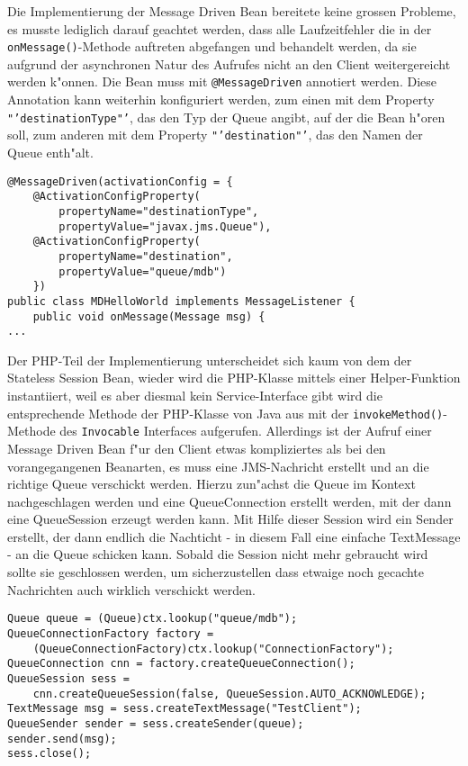 Die Implementierung der Message Driven Bean bereitete keine grossen Probleme, es musste lediglich
darauf geachtet werden, dass alle Laufzeitfehler die in der \texttt{onMessage()}-Methode auftreten
abgefangen und behandelt werden, da sie aufgrund der asynchronen Natur des Aufrufes nicht an den 
Client weitergereicht werden k"onnen. Die Bean muss mit \texttt{@MessageDriven} annotiert werden.
Diese Annotation kann weiterhin konfiguriert werden, zum einen mit dem Property \texttt{"'destinationType"'}, 
das den Typ der Queue angibt, auf der die Bean h"oren soll, zum anderen mit dem Property \texttt{"'destination"'},
das den Namen der Queue enth"alt.
\begin{lstlisting}[caption=Konfiguration der Message Driven Bean]
@MessageDriven(activationConfig = {
    @ActivationConfigProperty(
        propertyName="destinationType", 
        propertyValue="javax.jms.Queue"),
    @ActivationConfigProperty(
        propertyName="destination", 
        propertyValue="queue/mdb")
    })
public class MDHelloWorld implements MessageListener {
    public void onMessage(Message msg) {
...
\end{lstlisting}
Der PHP-Teil der Implementierung unterscheidet sich kaum von dem der Stateless Session Bean, wieder wird
die PHP-Klasse mittels einer Helper-Funktion instantiiert, weil es aber diesmal kein Service-Interface gibt
wird die entsprechende Methode der PHP-Klasse von Java aus mit der \texttt{invokeMethod()}-Methode des
\texttt{Invocable} Interfaces aufgerufen.
Allerdings ist der Aufruf einer Message Driven Bean f"ur den Client etwas kompliziertes als bei den
vorangegangenen Beanarten, es muss eine JMS-Nachricht erstellt und an die richtige Queue verschickt werden.
Hierzu zun"achst die Queue im Kontext nachgeschlagen werden und eine QueueConnection erstellt werden, mit der
dann eine QueueSession erzeugt werden kann. Mit Hilfe dieser Session wird ein Sender erstellt, der dann
endlich die Nachticht - in diesem Fall eine einfache TextMessage - an die Queue schicken kann. Sobald die Session
nicht mehr gebraucht wird sollte sie geschlossen werden, um sicherzustellen dass etwaige noch gecachte Nachrichten
auch wirklich verschickt werden.
\begin{lstlisting}[caption=Senden einer JMS-Nachricht]
Queue queue = (Queue)ctx.lookup("queue/mdb");
QueueConnectionFactory factory = 
    (QueueConnectionFactory)ctx.lookup("ConnectionFactory");
QueueConnection cnn = factory.createQueueConnection();
QueueSession sess = 
    cnn.createQueueSession(false, QueueSession.AUTO_ACKNOWLEDGE);
TextMessage msg = sess.createTextMessage("TestClient");
QueueSender sender = sess.createSender(queue);
sender.send(msg);
sess.close();
\end{lstlisting}



